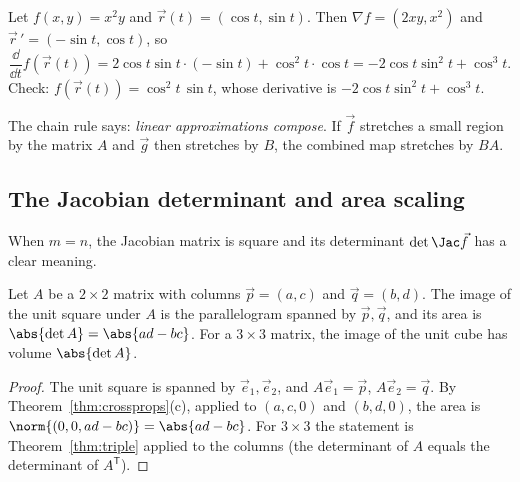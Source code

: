 \begin{example}
Let $f(x,y)=x^2y$ and $\vec r(t)=(\cos t,\sin t)$. Then $\nabla f=(2xy,x^2)$ and $\vec r\,'=(-\sin t,\cos t)$, so
\[
\frac{\dd}{\dd t}f(\vec r(t))=2\cos t\sin t\cdot(-\sin t)+\cos^2t\cdot\cos t=-2\cos t\sin^2t+\cos^3t.
\]
Check: $f(\vec r(t))=\cos^2t\,\sin t$, whose derivative is $-2\cos t\sin^2t+\cos^3t$. \checkmark
\end{example}

\begin{intuition}
The chain rule says: \emph{linear approximations compose}. If $\vec f$ stretches a small region by the matrix $A$ and $\vec g$ then stretches by $B$, the combined map stretches by $BA$.
\end{intuition}

\subsection{The Jacobian determinant and area scaling}

When $m=n$, the Jacobian matrix is square and its determinant $\det\Jac\vec f$ has a clear meaning.

\begin{proposition}\label{prop:detarea}
Let $A$ be a $2\times2$ matrix with columns $\vec p=(a,c)$ and $\vec q=(b,d)$. The image of the unit square under $A$ is the parallelogram spanned by $\vec p,\vec q$, and its area is $\abs{\det A}=\abs{ad-bc}$. For a $3\times3$ matrix, the image of the unit cube has volume $\abs{\det A}$.
\end{proposition}

\begin{proof}
The unit square is spanned by $\vec e_1,\vec e_2$, and $A\vec e_1=\vec p$, $A\vec e_2=\vec q$. By Theorem~\ref{thm:crossprops}(c), applied to $(a,c,0)$ and $(b,d,0)$, the area is $\norm{(0,0,ad-bc)}=\abs{ad-bc}$. For $3\times3$ the statement is Theorem~\ref{thm:triple} applied to the columns (the determinant of $A$ equals the determinant of $A^{\mathsf T}$).
\end{proof}

